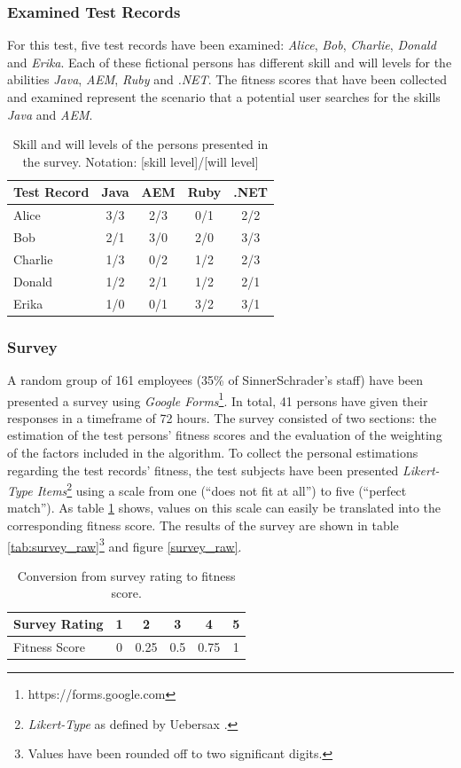\subsubsection{Examined Test Records}
For this test, five test records have been examined: \textit{Alice}, \textit{Bob}, \textit{Charlie}, \textit{Donald} and \textit{Erika}. Each of these fictional persons has different skill and will levels for the abilities \textit{Java}, \textit{AEM}, \textit{Ruby} and \textit{.NET}. The fitness scores that have been collected and examined represent the scenario that a potential user searches for the skills \textit{Java} and \textit{AEM}.
\begin{table}[H]
\centering
  \begin{tabular}{l||c|c|c|c}
		Test Record  & Java & AEM & Ruby & .NET\\
		\hline
		Alice   & 3/3   & 2/3  & 0/1   & 2/2 \\
		Bob     & 2/1   & 3/0  & 2/0   & 3/3 \\
		Charlie & 1/3   & 0/2  & 1/2   & 2/3 \\
		Donald  & 1/2   & 2/1  & 1/2   & 2/1 \\
		Erika   & 1/0   & 0/1  & 3/2   & 3/1 \\
  \end{tabular}
\caption[Survey: Test Record Overview]{Skill and will levels of the persons presented in the survey. Notation: [skill level]/[will level]}
\end{table}
\subsubsection{Survey}
A random group of 161 employees (35\% of SinnerSchrader's staff) have been presented a survey using \textit{Google Forms}\footnote{https://forms.google.com}.
In total, 41 persons have given their responses in a timeframe of 72 hours.
The survey consisted of two sections: the estimation of the test persons' fitness scores and the evaluation of the weighting of the factors included in the algorithm. To collect the personal estimations regarding the test records' fitness, the test subjects have been presented
\textit{Likert-Type Items}\footnote{\textit{Likert-Type} as defined by Uebersax \cite{likerttype}.} using a scale from one (``does not fit at all'') to five (``perfect match''). As table \ref{tab:scoretrans} shows, values on this scale can easily be translated into the corresponding fitness score. The results of the survey are shown in table \ref{tab:survey_raw}\footnote{Values have been rounded off to two significant digits.} and figure \ref{survey_raw}.
\begin{table}[H]
\centering
\begin{tabular}{l||c|c|c|c|c}
	Survey Rating & 1 & 2    & 3   & 4    & 5\\
	\hline
	Fitness Score & 0 & 0.25 & 0.5 & 0.75 & 1\\
\end{tabular}
\caption[Survey: Rating to Fitness Score]{Conversion from survey rating to fitness score.}
\label{tab:scoretrans}
\end{table}

